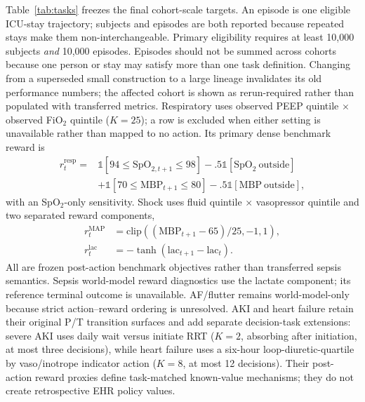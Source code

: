 \documentclass[sigconf,review]{acmart}
\begin{document}
Table~\ref{tab:tasks} freezes the final cohort-scale targets. An episode is one eligible ICU-stay trajectory; subjects and episodes are both reported because repeated stays make them non-interchangeable. Primary eligibility requires at least 10,000 subjects \emph{and} 10,000 episodes. Episodes should not be summed across cohorts because one person or stay may satisfy more than one task definition. Changing from a superseded small construction to a large lineage invalidates its old performance numbers; the affected cohort is shown as rerun-required rather than populated with transferred metrics. Respiratory uses observed PEEP quintile $\times$ observed FiO$_2$ quintile ($K=25$); a row is excluded when either setting is unavailable rather than mapped to no action. Its primary dense benchmark reward is
\begin{equation}
\begin{aligned}
r^{\mathrm{resp}}_t={}&\mathbb{1}[94\!\leq\!\mathrm{SpO}_{2,t+1}\!\leq\!98]
 -.5\mathbb{1}[\mathrm{SpO}_2\ \mathrm{outside}]\\
&+\mathbb{1}[70\!\leq\!\mathrm{MBP}_{t+1}\!\leq\!80]
 -.5\mathbb{1}[\mathrm{MBP}\ \mathrm{outside}],
\end{aligned}
\end{equation}
with an SpO$_2$-only sensitivity. Shock uses fluid quintile $\times$ vasopressor quintile and two separated reward components,
\begin{equation}
\begin{aligned}
r^{\mathrm{MAP}}_t&=\mathrm{clip}((\mathrm{MBP}_{t+1}-65)/25,-1,1),\\
r^{\mathrm{lac}}_t&=-\tanh(\mathrm{lac}_{t+1}-\mathrm{lac}_{t}).
\end{aligned}
\end{equation}
All are frozen post-action benchmark objectives rather than transferred sepsis semantics. Sepsis world-model reward diagnostics use the lactate component; its reference terminal outcome is unavailable. AF/flutter remains world-model-only because strict action--reward ordering is unresolved. AKI and heart failure retain their original P/T transition surfaces and add separate decision-task extensions: severe AKI uses daily wait versus initiate RRT ($K=2$, absorbing after initiation, at most three decisions), while heart failure uses a six-hour loop-diuretic-quartile by vaso/inotrope indicator action ($K=8$, at most 12 decisions). Their post-action reward proxies define task-matched known-value mechanisms; they do not create retrospective EHR policy values.
\end{document}
